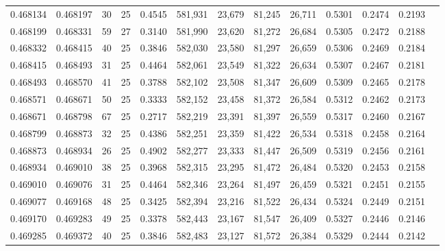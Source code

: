 \begin{tabular}{rrrrrrrrrrrrr}
0.468134 & 0.468197 &    30 &  25 &                                     0.4545 & 581,931 &  23,679 &  81,245 &  26,711 & 0.5301 & 0.2474 & 0.2193 \\
0.468199 & 0.468331 &    59 &  27 &                                     0.3140 & 581,990 &  23,620 &  81,272 &  26,684 & 0.5305 & 0.2472 & 0.2188 \\
0.468332 & 0.468415 &    40 &  25 &                                     0.3846 & 582,030 &  23,580 &  81,297 &  26,659 & 0.5306 & 0.2469 & 0.2184 \\
0.468415 & 0.468493 &    31 &  25 &                                     0.4464 & 582,061 &  23,549 &  81,322 &  26,634 & 0.5307 & 0.2467 & 0.2181 \\
0.468493 & 0.468570 &    41 &  25 &                                     0.3788 & 582,102 &  23,508 &  81,347 &  26,609 & 0.5309 & 0.2465 & 0.2178 \\
0.468571 & 0.468671 &    50 &  25 &                                     0.3333 & 582,152 &  23,458 &  81,372 &  26,584 & 0.5312 & 0.2462 & 0.2173 \\
0.468671 & 0.468798 &    67 &  25 &                                     0.2717 & 582,219 &  23,391 &  81,397 &  26,559 & 0.5317 & 0.2460 & 0.2167 \\
0.468799 & 0.468873 &    32 &  25 &                                     0.4386 & 582,251 &  23,359 &  81,422 &  26,534 & 0.5318 & 0.2458 & 0.2164 \\
0.468873 & 0.468934 &    26 &  25 &                                     0.4902 & 582,277 &  23,333 &  81,447 &  26,509 & 0.5319 & 0.2456 & 0.2161 \\
0.468934 & 0.469010 &    38 &  25 &                                     0.3968 & 582,315 &  23,295 &  81,472 &  26,484 & 0.5320 & 0.2453 & 0.2158 \\
0.469010 & 0.469076 &    31 &  25 &                                     0.4464 & 582,346 &  23,264 &  81,497 &  26,459 & 0.5321 & 0.2451 & 0.2155 \\
0.469077 & 0.469168 &    48 &  25 &                                     0.3425 & 582,394 &  23,216 &  81,522 &  26,434 & 0.5324 & 0.2449 & 0.2151 \\
0.469170 & 0.469283 &    49 &  25 &                                     0.3378 & 582,443 &  23,167 &  81,547 &  26,409 & 0.5327 & 0.2446 & 0.2146 \\
0.469285 & 0.469372 &    40 &  25 &                                     0.3846 & 582,483 &  23,127 &  81,572 &  26,384 & 0.5329 & 0.2444 & 0.2142 \\

\end{tabular}
